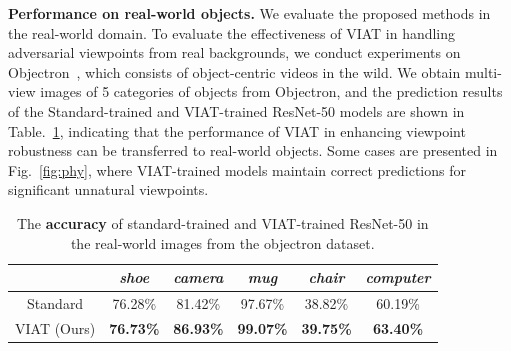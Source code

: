 \documentclass[10pt,journal,compsoc]{IEEEtran}
\begin{document}
\noindent\textbf{Performance on real-world objects.} \label{sec:real-world} We evaluate the proposed methods in the real-world domain. To evaluate the effectiveness of VIAT in handling adversarial viewpoints from real backgrounds, we conduct experiments on Objectron~\cite{ahmadyan2021objectron}, which consists of object-centric videos in the wild. We obtain multi-view images of 5 categories of objects from Objectron, and the prediction results of the Standard-trained and VIAT-trained ResNet-50 models are shown in Table.~\ref{table:objectron}, indicating that the performance of VIAT in enhancing viewpoint robustness can be transferred to real-world objects. Some cases are presented in Fig.~\ref{fig:phy}, where VIAT-trained models maintain correct predictions for significant unnatural viewpoints. 
\begin{table}[t]
\caption{The \textbf{accuracy} of standard-trained and VIAT-trained ResNet-50 in the real-world images from the objectron dataset.}

\label{table:objectron}
\setlength\tabcolsep{5.5pt}
\renewcommand\arraystretch{1.2}
\centering
\begin{tabular}{cl|c|c|c|c|c}
\hline
\multicolumn{2}{c|}{}   & \emph{shoe}           &  \emph{camera}         &  \emph{mug}            &  \emph{chair}          &  \emph{computer}       \\ \hline \hline
\multicolumn{2}{c|}{Standard} & 76.28\%          & 81.42\%          & 97.67\%          & 38.82\%          & 60.19\%          \\
\multicolumn{2}{c|}{VIAT (Ours)}     & \textbf{76.73\%} & \textbf{86.93\%} & \textbf{99.07\%} & \textbf{39.75\%} & \textbf{63.40\%} \\ \hline
\end{tabular}
\end{table}
\end{document}
